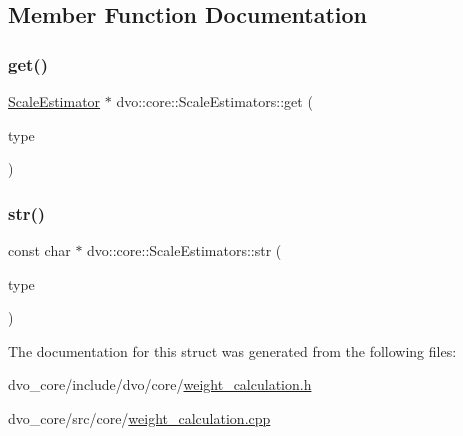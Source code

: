 \subsection{Member Function Documentation}
\mbox{\label{structdvo_1_1core_1_1_scale_estimators_a02a8b9af9cbd5e12b8b15e4c6cfa052a}} 
\subsubsection{\texorpdfstring{get()}{get()}}
{\footnotesize\ttfamily \mbox{\hyperlink{classdvo_1_1core_1_1_scale_estimator}{Scale\+Estimator}} $\ast$ dvo\+::core\+::\+Scale\+Estimators\+::get (\begin{DoxyParamCaption}\item[{\mbox{\hyperlink{structdvo_1_1core_1_1_scale_estimators_a5bd47dbbdca475d830703b07b0864f5e}{Scale\+Estimators\+::enum\+\_\+t}}}]{type }\end{DoxyParamCaption})\hspace{0.3cm}{\ttfamily [static]}}

\mbox{\label{structdvo_1_1core_1_1_scale_estimators_a96e97824b310becb2390c81e0d09f936}} 
\subsubsection{\texorpdfstring{str()}{str()}}
{\footnotesize\ttfamily const char $\ast$ dvo\+::core\+::\+Scale\+Estimators\+::str (\begin{DoxyParamCaption}\item[{\mbox{\hyperlink{structdvo_1_1core_1_1_scale_estimators_a5bd47dbbdca475d830703b07b0864f5e}{enum\+\_\+t}}}]{type }\end{DoxyParamCaption})\hspace{0.3cm}{\ttfamily [static]}}



The documentation for this struct was generated from the following files\+:\begin{DoxyCompactItemize}
\item 
dvo\+\_\+core/include/dvo/core/\mbox{\hyperlink{weight__calculation_8h}{weight\+\_\+calculation.\+h}}\item 
dvo\+\_\+core/src/core/\mbox{\hyperlink{weight__calculation_8cpp}{weight\+\_\+calculation.\+cpp}}\end{DoxyCompactItemize}
